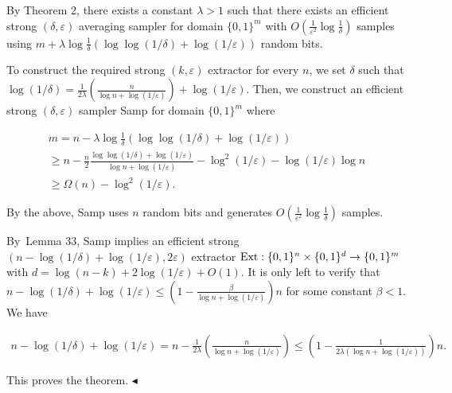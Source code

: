 By Theorem 2, there exists a constant $\lambda>1$ such that there exists an efficient strong $(\delta,\varepsilon)$ averaging sampler for domain $\{0,1\}^{m}$ with $O(\frac{1}{\varepsilon^{2}}\log\frac{1}{\delta})$ samples using $m+\lambda\log\frac{1}{\delta}(\log\log(1/\delta)+\log(1/\varepsilon))$ random bits.\par




To construct the required strong $(k,\varepsilon)$ extractor for every $n$, we set $\delta$ such that $\log(1/\delta)=\frac{1}{2\lambda}(\frac{n}{\log n+\log(1/\varepsilon)})+\log(1/\varepsilon)$.
Then, we construct an efficient strong $(\delta,\varepsilon)$ sampler Samp for domain $\{0,1\}^{m}$ where\par


\[\begin{gathered}
\displaystyle m \displaystyle=n-\lambda\log\frac{1}{\delta}(\log\log(1/\delta)+\log(1/\varepsilon)) \\
\displaystyle\geq n-\frac{n}{2}\frac{\log\log(1/\delta)+\log(1/\varepsilon)}{\log n+\log(1/\varepsilon)}-\log^{2}(1/\varepsilon)-\log(1/\varepsilon)\log n \\
\displaystyle\geq\Omega(n)-\log^{2}(1/\varepsilon).
\end{gathered}\]




By the above, Samp uses $n$ random bits and generates $O(\frac{1}{\varepsilon^{2}}\log\frac{1}{\delta})$ samples.\par




By Lemma 33, Samp implies an efficient strong $(n-\log(1/\delta)+\log(1/\varepsilon),2\varepsilon)$ extractor $\textup{{Ext}}:\{0,1\}^{n}\times\{0,1\}^{d}\to\{0,1\}^{m}$ with $d=\log(n-k)+2\log(1/\varepsilon)+O(1)$.
It is only left to verify that $n-\log(1/\delta)+\log(1/\varepsilon)\leq(1-\frac{\beta}{\log n+\log(1/\varepsilon)})n$ for some constant $\beta<1$.
We have\par


\[\begin{gathered}
n-\log(1/\delta)+\log(1/\varepsilon)=n-\frac{1}{2\lambda}(\frac{n}{\log n+\log(1/\varepsilon)})\leq(1-\frac{1}{2\lambda(\log n+\log(1/\varepsilon))})n.
\end{gathered}\]


This proves the theorem.
$\blacktriangleleft$\par






